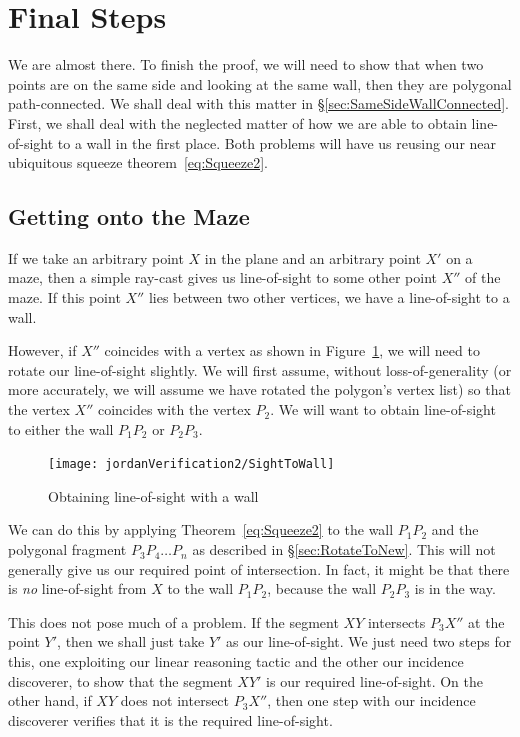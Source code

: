 \section{Final Steps}
We are almost there. To finish the proof, we will need to show that when two points are on the same side and looking at the same wall, then they are polygonal path-connected. We shall deal with this matter in \S\ref{sec:SameSideWallConnected}. First, we shall deal with the neglected matter of how we are able to obtain line-of-sight to a wall in the first place. Both problems will have us reusing our near ubiquitous squeeze theorem~\eqref{eq:Squeeze2}.

\subsection{Getting onto the Maze}
If we take an arbitrary point $X$ in the plane and an arbitrary point $X'$ on a maze, then a simple ray-cast gives us line-of-sight to some other point $X''$ of the maze. If this point $X''$ lies between two other vertices, we have a line-of-sight to a wall. 

However, if $X''$ coincides with a vertex as shown in Figure~\ref{fig:SightToWall}, we will need to rotate our line-of-sight slightly. We will first assume, without loss-of-generality (or more accurately, we will assume we have rotated the polygon's vertex list) so that the vertex $X''$ coincides with the vertex $P_2$. We will want to obtain line-of-sight to either the wall $P_1P_2$ or $P_2P_3$.

\begin{figure}
  \centering\texttt{[image: jordanVerification2/SightToWall]}
  \caption{Obtaining line-of-sight with a wall}
  \label{fig:SightToWall}
\end{figure}

We can do this by applying Theorem~\ref{eq:Squeeze2} to the wall $P_1P_2$ and the polygonal fragment $P_3P_4\ldots P_n$ as described in \S\ref{sec:RotateToNew}. This will not generally give us our required point of intersection. In fact, it might be that there is \emph{no} line-of-sight from $X$ to the wall $P_1P_2$, because the wall $P_2P_3$ is in the way. 

This does not pose much of a problem. If the segment $XY$ intersects $P_3X''$ at the point $Y'$, then we shall just take $Y'$ as our line-of-sight. We just need two steps for this, one exploiting our linear reasoning tactic and the other our incidence discoverer, to show that the segment $XY'$ is our required line-of-sight. On the other hand, if $XY$ does not intersect $P_3X''$, then one step with our incidence discoverer verifies that it is the required line-of-sight. 

